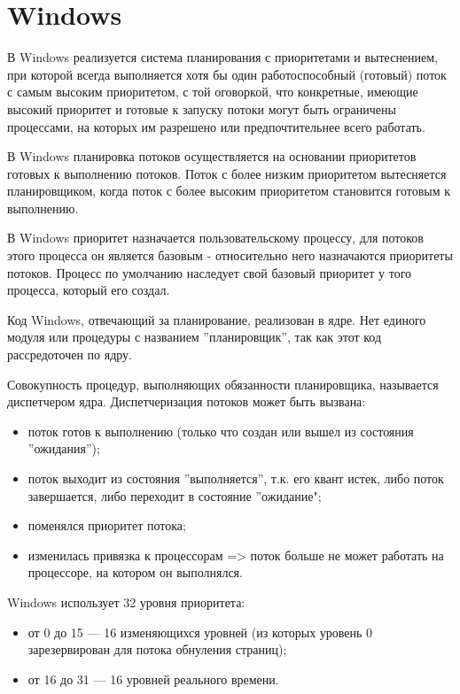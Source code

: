 \documentclass[a4paper,14pt,russian]{extreport}
\begin{document}
	\section{Windows}
	 
	В Windows реализуется система планирования с приоритетами и вытеснением, при которой всегда выполняется хотя бы один работоспособный (готовый) поток с самым высоким приоритетом, с той оговоркой, что конкретные, имеющие высокий приоритет и готовые к запуску потоки могут быть ограничены процессами, на которых им разрешено или предпочтительнее всего работать.
	
	В Windows планировка потоков осуществляется на основании приоритетов готовых к выполнению потоков.
	Поток с более низким приоритетом вытесняется планировщиком, когда поток с более высоким приоритетом	становится готовым к выполнению.
	
	В Windows приоритет назначается пользовательскому процессу, для потоков этого процесса он является базовым - относительно него назначаются приоритеты потоков. 
	Процесс по умолчанию наследует свой базовый приоритет у того процесса, который его создал.
	
	Код Windows, отвечающий за планирование, реализован в ядре.
	Нет единого модуля или процедуры с названием ”планировщик”, так как этот код рассредоточен по ядру. 
	
	Совокупность процедур, выполняющих обязанности планировщика, называется диспетчером ядра.
	Диспетчеризация потоков может быть вызвана:
	\begin{itemize}
		\item поток готов к выполнению (только что создан или вышел из состояния ”ожидания”);
		\item поток выходит из состояния ”выполняется”, т.к. его квант истек, либо поток завершается, либо переходит в состояние ”ожидание";
		\item поменялся приоритет потока;
		\item изменилась привязка к процессорам => поток больше не может работать на процессоре, на котором он выполнялся.
	\end{itemize}
	
	Windows использует 32 уровня приоритета:
	\begin{itemize}
		\item от 0 до 15 –-- 16 изменяющихся уровней (из которых уровень 0 зарезервирован для потока обнуления страниц);
		\item от 16 до 31 –-- 16 уровней реального времени.
	\end{itemize}
	
\end{document}
